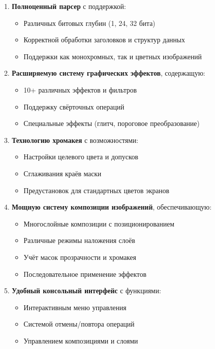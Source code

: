 \documentclass[a4paper,12pt]{article}
\begin{document}
	\begin{enumerate}
		\item \textbf{Полноценный парсер} с поддержкой:
		\begin{itemize}
			\item Различных битовых глубин (1, 24, 32 бита)
			\item Корректной обработки заголовков и структур данных
			\item Поддержки как монохромных, так и цветных изображений
		\end{itemize}
		
		\item \textbf{Расширяемую систему графических эффектов}, содержащую:
		\begin{itemize}
			\item 10+ различных эффектов и фильтров
			\item Поддержку свёрточных операций
			\item Специальные эффекты (глитч, пороговое преобразование)
		\end{itemize}
		
		\item \textbf{Технологию хромакея} с возможностями:
		\begin{itemize}
			\item Настройки целевого цвета и допусков
			\item Сглаживания краёв маски
			\item Предустановок для стандартных цветов экранов
		\end{itemize}
		
		\item \textbf{Мощную систему композиции изображений}, обеспечивающую:
		\begin{itemize}
			\item Многослойные композиции с позиционированием
			\item Различные режимы наложения слоёв
			\item Учёт масок прозрачности и хромакея
			\item Последовательное применение эффектов
		\end{itemize}
		
		\item \textbf{Удобный консольный интерфейс} с функциями:
		\begin{itemize}
			\item Интерактивным меню управления
			\item Системой отмены/повтора операций
			\item Управлением композициями и слоями
		\end{itemize}
	\end{enumerate}
	
\end{document}
